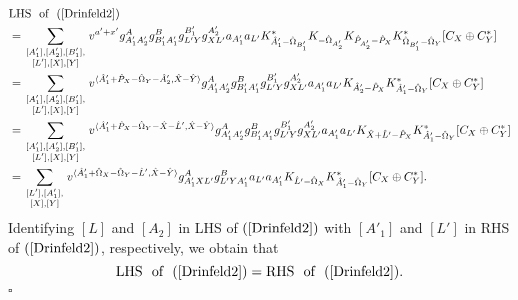 \documentclass[reqno,12pt]{amsart}
\numberwithin{equation}{section}
\def\lr#1{\langle #1\rangle} \def\fin{\hfill$\square$}  \def\lra{\longrightarrow} \def\Tor{\mbox{\rm Tor}\,}
\theoremstyle{plain} %
\theoremstyle{definition} %
\begin{document}
\begin{equation*}\begin{split}
&\mbox{LHS~~of}~~(\ref{Drinfeld2})\\&=\sum_{\begin{smallmatrix}[A'_1],[A'_2],[B'_1],\\ [L'],[X],[Y]\end{smallmatrix}}v^{a'+x'}
g_{A'_1A'_2}^Ag_{B'_1A'_1}^Bg_{L'Y}^{B'_1}g_{XL'}^{A'_2}
a_{A'_1}a_{L'}K_{\hat{A}'_1-\hat{\Omega}_{B'_1}}^\ast K_{-\hat{\Omega}_{A'_2}} K_{\hat{P}_{A'_2}-\hat{P}_X}K_{\hat{\Omega}_{B'_1}-\hat{\Omega}_Y}^\ast[C_X\oplus C_Y^\ast]\\
&=\sum_{\begin{smallmatrix}[A'_1],[A'_2],[B'_1],\\ [L'],[X],[Y]\end{smallmatrix}}v^{\lr{\hat{A}'_1+\hat{P}_X-\hat{\Omega}_Y-\hat{A}'_2,\hat{X}-\hat{Y}}}
g_{A'_1A'_2}^Ag_{B'_1A'_1}^Bg_{L'Y}^{B'_1}g_{XL'}^{A'_2}
a_{A'_1}a_{L'}K_{\hat{A}'_2-\hat{P}_X}K_{\hat{A}'_1-\hat{\Omega}_Y}^\ast[C_X\oplus C_Y^\ast]\\
&=\sum_{\begin{smallmatrix}[A'_1],[A'_2],[B'_1],\\ [L'],[X],[Y]\end{smallmatrix}}v^{\lr{\hat{A}'_1+\hat{P}_X-\hat{\Omega}_Y-\hat{X}-\hat{L}',\hat{X}-\hat{Y}}}
g_{A'_1A'_2}^Ag_{B'_1A'_1}^Bg_{L'Y}^{B'_1}g_{XL'}^{A'_2}
a_{A'_1}a_{L'}K_{\hat{X}+\hat{L}'-\hat{P}_X}K_{\hat{A}'_1-\hat{\Omega}_Y}^\ast[C_X\oplus C_Y^\ast]\\
&=\sum_{\begin{smallmatrix}[L'], [A'_1],\\ [X],[Y]\end{smallmatrix}}v^{\lr{\hat{A}'_1+\hat{\Omega}_X-\hat{\Omega}_Y-\hat{L}',\hat{X}-\hat{Y}}}
g_{A'_1XL'}^Ag_{L'YA'_1}^B
a_{L'}a_{A'_1}K_{\hat{L}'-\hat{\Omega}_X}K_{\hat{A}'_1-\hat{\Omega}_Y}^\ast[C_X\oplus C_Y^\ast].
\end{split}\end{equation*}
Identifying $[L]$ and $[A_2]$ in LHS of $(\ref{Drinfeld2})$ with $[A'_1]$ and $[L']$ in RHS of $(\ref{Drinfeld2})$, respectively, we obtain that
\begin{equation*}
\mbox{LHS~~of}~~(\ref{Drinfeld2})=\mbox{RHS~~of}~~(\ref{Drinfeld2}).\end{equation*}
\fin
\end{document}
